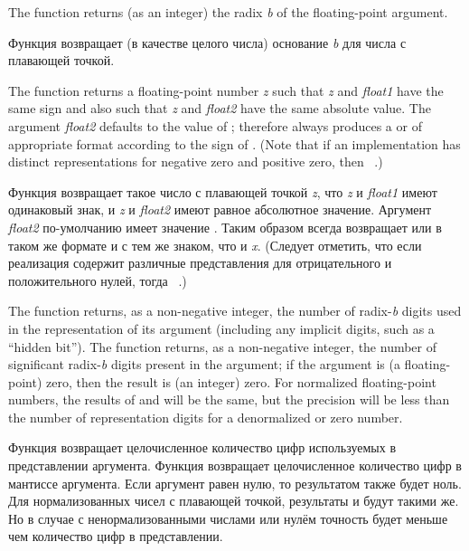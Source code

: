 \begin{defun}[Function]
The function  returns (as an integer)
the radix \emph{b} of the floating-point argument.

Функция  возвращает (в качестве целого числа)
основание \emph{b} для числа с плавающей точкой.

The function  returns a floating-point number \emph{z} such
that \emph{z} and \emph{float1} have the same sign and also such that
\emph{z} and \emph{float2} have the same absolute value.
The argument \emph{float2} defaults to the value of ;
 therefore always produces a  or 
of appropriate format
according to the sign of .  (Note that if an implementation
has distinct representations for negative zero and positive zero,
then  \EV\ .)

Функция  возвращает такое число с плавающей точкой \emph{z}, что
\emph{z} и \emph{float1} имеют одинаковый знак, и \emph{z} и \emph{float2} имеют
равное абсолютное значение.
Аргумент \emph{float2} по-умолчанию имеет значение .
Таким образом  всегда возвращает  или  в
таком же формате и с тем же знаком, что и \emph{x}. (Следует отметить, что если
реализация содержит различные представления для отрицательного и положительного
нулей, тогда  \EV\ .)

The function  returns, as a non-negative integer,
the number of radix-\emph{b} digits
used in the representation of its argument (including any implicit
digits, such as a ``hidden bit'').
The function 
returns, as a non-negative integer,
the number of significant radix-\emph{b} digits present in the
argument; if the argument is (a floating-point)
zero, then the result is (an integer) zero.
For normalized floating-point numbers, the results of 
and 
will be the same, but the precision will be less than the
number of representation digits for a denormalized or zero number.

Функция  возвращает целочисленное количество
цифр используемых в представлении аргумента. Функция 
возвращает целочисленное количество цифр в мантиссе аргумента. Если аргумент
равен нулю, то результатом также будет ноль.
Для нормализованных чисел с плавающей точкой, результаты  и
 будут такими же. Но в случае с ненормализованными числами
или нулём точность будет меньше чем количество цифр в представлении.


\end{defun}
